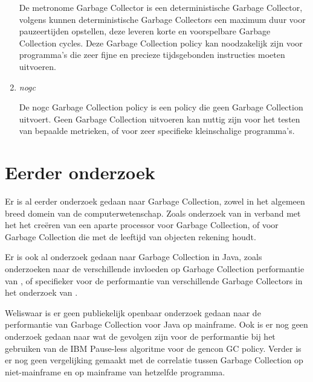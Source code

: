 \begin{enumerate}
            De metronome Garbage Collector is een deterministische Garbage Collector, volgens \textcite{Oracle2008} kunnen deterministische Garbage Collectors een maximum duur voor pauzeertijden opstellen, deze leveren korte en voorspelbare Garbage Collection cycles.
            Deze Garbage Collection policy kan noodzakelijk zijn voor programma's die zeer fijne en precieze tijdsgebonden instructies moeten uitvoeren.
            
    \item \textit{nogc}
    
            De nogc Garbage Collection policy is een policy die geen Garbage Collection uitvoert.
            Geen Garbage Collection uitvoeren kan nuttig zijn voor het testen van bepaalde metrieken, of voor zeer specifieke kleinschalige programma's.
        


\end{enumerate}
\autocite{IBM2023}

\section{Eerder onderzoek}
\label{sec:eerderonderzoek}
Er is al eerder onderzoek gedaan naar Garbage Collection, zowel in het algemeen breed domein van de computerwetenschap. 
Zoals onderzoek van \textcite{Dijkstra1978} in verband met het het creëren van een aparte processor voor Garbage Collection, of \textcite{Lieberman1981} voor Garbage Collection die met de leeftijd van objecten rekening houdt.


Er is ook al onderzoek gedaan naar Garbage Collection in Java, zoals onderzoeken naar de verschillende invloeden op Garbage Collection performantie van \textcite{Dijkstra1978}, of specifieker voor de performantie van verschillende Garbage Collectors in het onderzoek van \textcite{Grgic2018}.


Weliswaar is er geen publiekelijk openbaar onderzoek gedaan naar de performantie van Garbage Collection voor Java op mainframe.
Ook is er nog geen onderzoek gedaan naar wat de gevolgen zijn voor de performantie bij het gebruiken van de IBM Pause-less algoritme voor de gencon GC policy.
Verder is er nog geen vergelijking gemaakt met de correlatie tussen Garbage Collection op niet-mainframe en op mainframe van hetzelfde programma.
